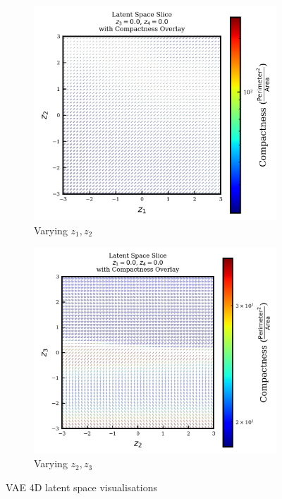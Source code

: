 \documentclass{article}
\begin{document}
\begin{figure}[H]
    \centering
    \begin{subfigure}{0.45\textwidth}
        \includegraphics[width=\linewidth]{figures/VAEmodels/model3/varying_z1_z2_fixed_z3=0.0_z4=0.0.png}
        \caption{Varying $z_1, z_2$}
    \end{subfigure}
    \hfill
    \begin{subfigure}{0.45\textwidth}
        \includegraphics[width=\linewidth]{figures/VAEmodels/model3/varying_z2_z3_fixed_z1=0.0_z4=0.0.png}
        \caption{Varying $z_2, z_3$}
    \end{subfigure}
    \caption{VAE 4D latent space visualisations}
\end{figure}
\end{document}
